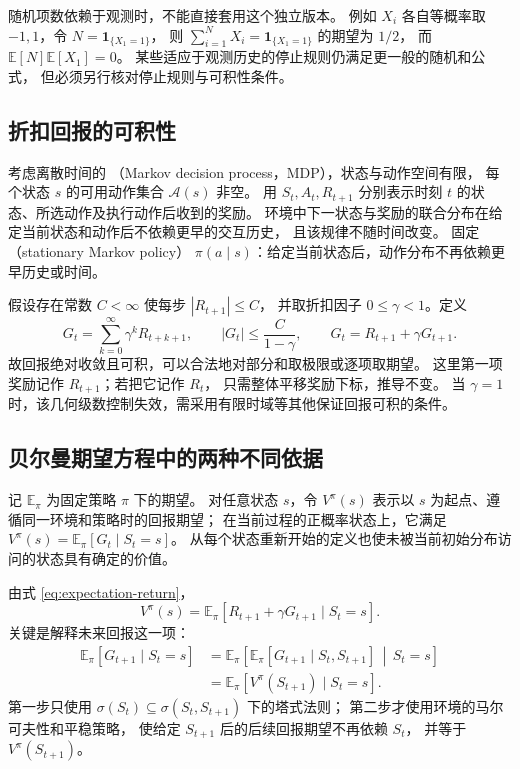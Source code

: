 \documentclass[UTF8]{ctexart}
\begin{document}
随机项数依赖于观测时，不能直接套用这个独立版本。
例如 $X_i$ 各自等概率取 $-1,1$，令 $N=\mathbf1_{\{X_1=1\}}$，
则 $\sum_{i=1}^{N}X_i=\mathbf1_{\{X_1=1\}}$ 的期望为 $1/2$，
而 $\mathbb E[N]\mathbb E[X_1]=0$。
某些适应于观测历史的停止规则仍满足更一般的随机和公式，
但必须另行核对停止规则与可积性条件。

\subsection{折扣回报的可积性}

考虑离散时间的
（Markov decision process，MDP），状态与动作空间有限，
每个状态 $s$ 的可用动作集合 $\mathcal A(s)$ 非空。
用 $S_t,A_t,R_{t+1}$ 分别表示时刻 $t$ 的状态、所选动作及执行动作后收到的奖励。
环境中下一状态与奖励的联合分布在给定当前状态和动作后不依赖更早的交互历史，
且该规律不随时间改变。
固定（stationary Markov policy）
$\pi(a\mid s)$：给定当前状态后，动作分布不再依赖更早历史或时间。

假设存在常数 $C<\infty$ 使每步 $|R_{t+1}|\leq C$，
并取折扣因子 $0\leq\gamma<1$。定义
\begin{equation}
  G_t=\sum_{k=0}^\infty\gamma^kR_{t+k+1},
  \qquad
  |G_t|\leq\frac{C}{1-\gamma},
  \qquad
  G_t=R_{t+1}+\gamma G_{t+1}.
  \label{eq:expectation-return}
\end{equation}
故回报绝对收敛且可积，可以合法地对部分和取极限或逐项取期望。
这里第一项奖励记作 $R_{t+1}$；若把它记作 $R_t$，
只需整体平移奖励下标，推导不变。
当 $\gamma=1$ 时，该几何级数控制失效，需采用有限时域等其他保证回报可积的条件。

\subsection{贝尔曼期望方程中的两种不同依据}

记 $\mathbb E_\pi$ 为固定策略 $\pi$ 下的期望。
对任意状态 $s$，令 $V^\pi(s)$ 表示以 $s$ 为起点、遵循同一环境和策略时的回报期望；
在当前过程的正概率状态上，它满足
$V^\pi(s)=\mathbb E_\pi[G_t\mid S_t=s]$。
从每个状态重新开始的定义也使未被当前初始分布访问的状态具有确定的价值。

由式 \eqref{eq:expectation-return}，
\[
  V^\pi(s)
  =\mathbb E_\pi[R_{t+1}+\gamma G_{t+1}\mid S_t=s].
\]
关键是解释未来回报这一项：
\begin{align}
  \mathbb E_\pi[G_{t+1}\mid S_t=s]
  &=\mathbb E_\pi\!\left[
      \mathbb E_\pi[G_{t+1}\mid S_t,S_{t+1}]
      \,\middle|\,S_t=s\right]
      \label{eq:expectation-bellman-tower}\\
  &=\mathbb E_\pi[V^\pi(S_{t+1})\mid S_t=s].
      \label{eq:expectation-bellman-markov}
\end{align}
第一步只使用
$\sigma(S_t)\subseteq\sigma(S_t,S_{t+1})$ 下的塔式法则；
第二步才使用环境的马尔可夫性和平稳策略，
使给定 $S_{t+1}$ 后的后续回报期望不再依赖 $S_t$，
并等于 $V^\pi(S_{t+1})$。
\end{document}
